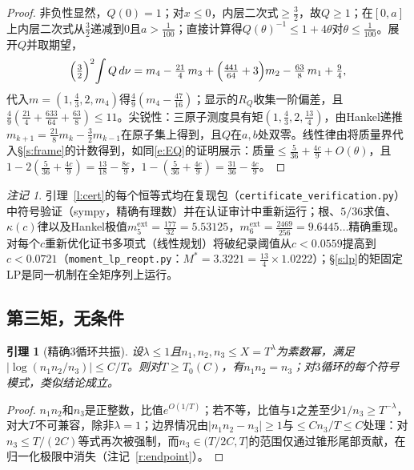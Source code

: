 \documentclass[11pt]{article}
\numberwithin{equation}{section}
\newtheorem{lemma}[theorem]{引理}
\theoremstyle{definition}
\theoremstyle{remark}
\newtheorem{remark}[theorem]{注记}
\begin{document}
\begin{proof}
非负性显然，$Q(0)=1$；对$x\le0$，内层二次式$\ge\tfrac32$，故$Q\ge1$；在$[0,a]$上内层二次式从$\tfrac32$递减到$0$且$a>\tfrac1{100}$；直接计算得$Q(\theta)^{-1}\le1+4\theta$对$\theta\le\tfrac1{100}$。展开$Q$并取期望，
\[
\Bigl(\tfrac32\Bigr)^2\!\int Q\,d\nu
=m_4-\tfrac{21}4\,m_3+\Bigl(\tfrac{441}{64}+3\Bigr)m_2
-\tfrac{63}8\,m_1+\tfrac94,
\]
代入$m=(1,\tfrac43,2,m_4)$得$\tfrac49(m_4-\tfrac{47}{16})$；显示的$R_Q$收集一阶偏差，且$\tfrac49(\tfrac{21}4+\tfrac{633}{64}+\tfrac{63}8)\le11$。尖锐性：三原子测度具有矩$(1,\tfrac43,2,\tfrac{13}4)$，由Hankel递推$m_{k+1}=\tfrac{21}8m_k-\tfrac32m_{k-1}$在原子集上得到，且$Q$在$a,b$处双零。线性律由将质量界代入\S\ref{s:frame}的计数得到，如同\eqref{e:EQ}的证明展示：质量$\le\tfrac5{36}+\tfrac{4c}9+O(\theta)$，且$1-2(\tfrac5{36}+\tfrac{4c}9)=\tfrac{13}{18}-\tfrac{8c}9$，$1-(\tfrac5{36}+\tfrac{4c}9)=\tfrac{31}{36}-\tfrac{4c}9$。
\end{proof}

\begin{remark}\label{r:certlp}
引理~\ref{l:cert}的每个恒等式均在复现包（\texttt{certificate\_verification.py}）中符号验证（sympy，精确有理数）并在认证审计中重新运行；根、$5/36$求值、$\kappa(c)$律以及Hankel极值$m_5^{\mathrm{ext}}=\tfrac{177}{32}=5.53125$，$m_6^{\mathrm{ext}}=\tfrac{2469}{256}=9.6445\ldots$精确重现。对每个$c$重新优化证书多项式（线性规划）将破纪录阈值从$c<0.0559$提高到$c<0.0721$（\texttt{moment\_lp\_reopt.py}：$M^{*}=3.3221=\tfrac{13}4\times1.0222$）；\S\ref{s:lp}的矩固定LP是同一机制在全矩序列上运行。
\end{remark}

\subsection{第三矩，无条件}\label{s:cert:m3}

\begin{lemma}[精确$3$循环共振]\label{l:m3res}
设$\lambda\le1$且$n_1,n_2,n_3\le X=T^{\lambda}$为素数幂，满足$|\log(n_1n_2/n_3)|\le C/T$。则对$T\ge T_0(C)$，有$n_1n_2=n_3$；对$3$循环的每个符号模式，类似结论成立。
\end{lemma}

\begin{proof}
$n_1n_2$和$n_3$是正整数，比值$e^{O(1/T)}$；若不等，比值与$1$之差至少$1/n_3\ge T^{-\lambda}$，对大$T$不可兼容，除非$\lambda=1$；边界情况由$|n_1n_2-n_3|\ge1$与$\le Cn_3/T\le C$处理：对$n_3\le T/(2C)$等式再次被强制，而$n_3\in(T/2C,T]$的范围仅通过锥形尾部贡献，在归一化极限中消失（注记~\ref{r:endpoint}）。
\end{proof}
\end{document}
